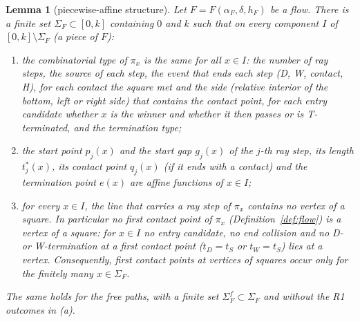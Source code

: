 \documentclass[11pt]{amsart}
\newtheorem{lemma}[theorem]{Lemma}
\theoremstyle{definition}
\theoremstyle{remark}
\numberwithin{equation}{section}
\begin{document}
\begin{lemma}[piecewise-affine structure]\label{lem:structure}
Let $F=F(\alpha_F,\delta,h_F)$ be a flow. There is a finite set $\Sigma_F\subset[0,k]$ containing $0$ and $k$ such
that on every component $I$ of $[0,k]\setminus\Sigma_F$ (a \emph{piece} of $F$):
\begin{enumerate}[label=(\alph*)]
\item the combinatorial type of $\pi_x$ is the same for all $x\in I$: the number of ray steps, the source of each step,
the event that ends each step (D, W, contact, H), for each contact the square met and the side (relative interior of
the bottom, left or right side) that contains the contact point, for each entry candidate whether $x$ is the winner and
whether it then passes or is T-terminated, and the termination type;
\item the start point $p_j(x)$ and the start gap $g_j(x)$ of the $j$-th ray step, its length $t^*_j(x)$, its contact
point $q_j(x)$ (if it ends with a contact) and the termination point $e(x)$ are affine functions of $x\in I$;
\item for every $x\in I$, the line that carries a ray step of $\pi_x$ contains no vertex of a square. In particular no
first contact point of $\pi_x$ (Definition~\ref{def:flow}) is a vertex of a square: for $x\in I$ no entry candidate, no
end collision and no D- or W-termination at a first contact point ($t_D=t_S$ or $t_W=t_S$) lies at a vertex.
Consequently, first contact points at vertices of squares occur only for the finitely many $x\in\Sigma_F$.
\end{enumerate}
The same holds for the free paths, with a finite set $\Sigma^f_F\subset\Sigma_F$ and without the R1 outcomes in (a).
\end{lemma}
\end{document}
